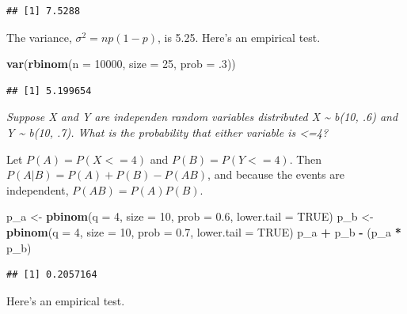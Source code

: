 \documentclass[]{book}
\newenvironment{Shaded}{\begin{snugshade}}{\end{snugshade}}
\newcommand{\DataTypeTok}[1]{\textcolor[rgb]{0.13,0.29,0.53}{#1}}
\newcommand{\DecValTok}[1]{\textcolor[rgb]{0.00,0.00,0.81}{#1}}
\newcommand{\FloatTok}[1]{\textcolor[rgb]{0.00,0.00,0.81}{#1}}
\newcommand{\KeywordTok}[1]{\textcolor[rgb]{0.13,0.29,0.53}{\textbf{#1}}}
\newcommand{\NormalTok}[1]{#1}
\newcommand{\OperatorTok}[1]{\textcolor[rgb]{0.81,0.36,0.00}{\textbf{#1}}}
\newcommand{\OtherTok}[1]{\textcolor[rgb]{0.56,0.35,0.01}{#1}}
\newcommand{\StringTok}[1]{\textcolor[rgb]{0.31,0.60,0.02}{#1}}
\begin{document}
\begin{verbatim}
## [1] 7.5288
\end{verbatim}

The variance, \(\sigma^2 = np (1 - p)\), is 5.25. Here's an empirical test.

\begin{Shaded}
\begin{Highlighting}[]
\KeywordTok{var}\NormalTok{(}\KeywordTok{rbinom}\NormalTok{(}\DataTypeTok{n =} \DecValTok{10000}\NormalTok{, }\DataTypeTok{size =} \DecValTok{25}\NormalTok{, }\DataTypeTok{prob =} \FloatTok{.3}\NormalTok{))}
\end{Highlighting}
\end{Shaded}

\begin{verbatim}
## [1] 5.199654
\end{verbatim}

\emph{Suppose X and Y are independen random variables distributed X \textasciitilde{} b(10, .6) and Y \textasciitilde{} b(10, .7). What is the probability that either variable is \textless=4?}

Let \(P(A) = P(X<=4)\) and \(P(B) = P(Y<=4)\). Then \(P(A|B) = P(A) + P(B) - P(AB)\), and because the events are independent, \(P(AB) = P(A)P(B)\).

\begin{Shaded}
\begin{Highlighting}[]
\NormalTok{p_a <-}\StringTok{ }\KeywordTok{pbinom}\NormalTok{(}\DataTypeTok{q =} \DecValTok{4}\NormalTok{, }\DataTypeTok{size =} \DecValTok{10}\NormalTok{, }\DataTypeTok{prob =} \FloatTok{0.6}\NormalTok{, }\DataTypeTok{lower.tail =} \OtherTok{TRUE}\NormalTok{)}
\NormalTok{p_b <-}\StringTok{ }\KeywordTok{pbinom}\NormalTok{(}\DataTypeTok{q =} \DecValTok{4}\NormalTok{, }\DataTypeTok{size =} \DecValTok{10}\NormalTok{, }\DataTypeTok{prob =} \FloatTok{0.7}\NormalTok{, }\DataTypeTok{lower.tail =} \OtherTok{TRUE}\NormalTok{)}
\NormalTok{p_a }\OperatorTok{+}\StringTok{ }\NormalTok{p_b }\OperatorTok{-}\StringTok{ }\NormalTok{(p_a }\OperatorTok{*}\StringTok{ }\NormalTok{p_b)}
\end{Highlighting}
\end{Shaded}

\begin{verbatim}
## [1] 0.2057164
\end{verbatim}

Here's an empirical test.
\end{document}
